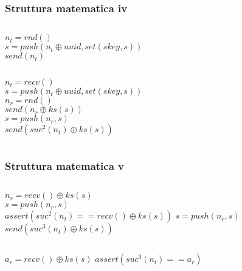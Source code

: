 \begin{frame}
    \frametitle{Struttura matematica iv}
    \begin{columns}
    \end{columns}
    \begin{columns}
            \(n_t = rnd()\)\\ \pause
            \(s = push(n_t \oplus uuid, set(skey, s))\)\\ \pause
            \(send(n_t)\)\pause
    \end{columns}
    \begin{columns}
            \(n_t = recv()\)\\\pause
           \(s = push(n_t \oplus uuid, set(skey, s))\)\\\pause
            \(n_r = rnd()\)\\\pause
            \(send(n_r \oplus ks(s))\)\\\pause
            \(s = push(n_r, s)\)\\\pause
            \(send(suc^2(n_t) \oplus ks(s))\)
    \end{columns}
\end{frame}

\begin{frame}
    \frametitle{Struttura matematica v}
    \begin{columns}
            \(n_r = recv() \oplus ks(s)\)\\\pause
            \(s = push(n_r, s)\)\\\pause
            \(assert(suc^2(n_t) == recv() \oplus ks(s))\)\pause
            \(s = push(n_r, s)\)\\\pause
            \(send(suc^3(n_t) \oplus ks(s))\)\pause
   \end{columns}
    \begin{columns}
            \(a_r = recv() \oplus ks(s)\) \pause
            \(assert(suc^3(n_t) == a_r)\)
    \end{columns}
\end{frame}

